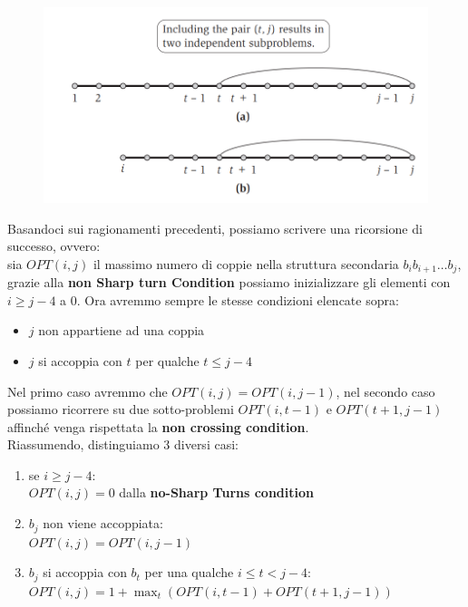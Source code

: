 \begin{figure}[H]
  \centering
  \includegraphics[width=\textwidth, keepaspectratio]{capitoli/programmazione_dinamica/imgs/rna3.png}
  \centering
\end{figure}


Basandoci sui ragionamenti precedenti, possiamo scrivere
una ricorsione di successo, ovvero:\\

sia $OPT(i,j)$ il massimo numero di coppie nella
struttura secondaria $b_i b_{i+1} \ldots b_j$, grazie alla \textbf{non
  Sharp turn Condition} possiamo inizializzare gli elementi con
$i \geq j -4$ a $0$. Ora avremmo sempre le stesse condizioni
elencate sopra:
\begin{itemize}
  \item $j$ non appartiene ad una coppia
  \item $j$ si accoppia
        con $t$ per qualche $t \leq j - 4$
\end{itemize}

Nel primo caso avremmo che $OPT(i,j) = OPT(i, j-1)$, nel secondo caso
possiamo ricorrere su due sotto-problemi $OPT(i, t-1)$ e
$OPT(t+1, j-1)$ affinché venga rispettata la \textbf{non crossing
  condition}.\\

Riassumendo, distinguiamo 3 diversi casi:
\begin{enumerate}
  \item se $i \ge j -4$:\\
        $OPT(i,j) = 0$ dalla \textbf{no-Sharp Turns condition}
  \item $b_j$ non viene accoppiata:\\ $OPT(i,j) = OPT(i,j-1)$
  \item $b_j$ si accoppia con $b_t$ per una qualche $i \le t < j -4$:\\
        $OPT(i,j) = 1 + \max_t(OPT(i, t-1) + OPT(t+1, j-1))$
\end{enumerate}


